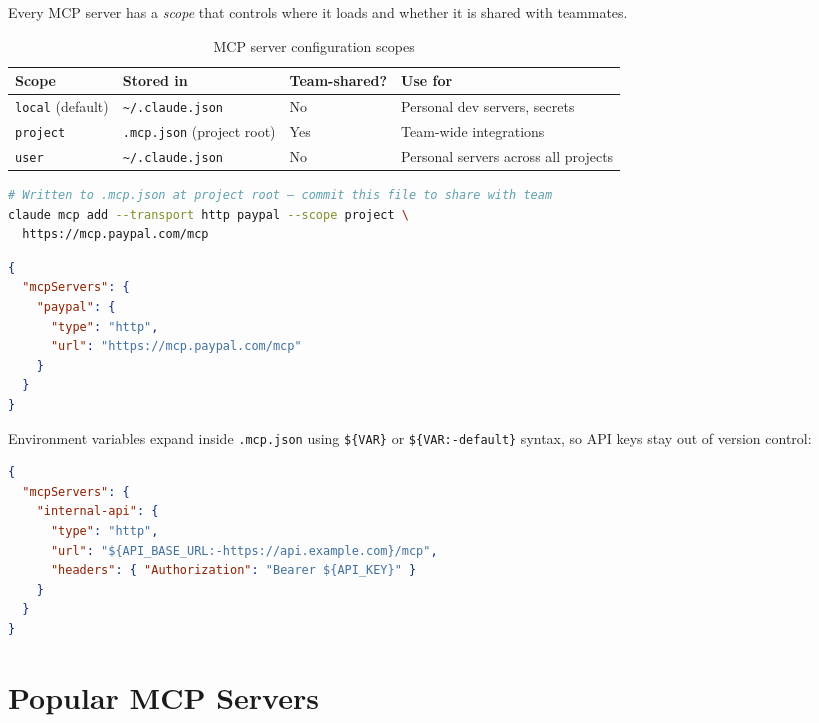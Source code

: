 
Every MCP server has a \emph{scope} that controls where it loads and whether
it is shared with teammates.

\begin{table}[ht]
\centering
\caption{MCP server configuration scopes}
\label{tab:mcp-scopes}
\begin{tabularx}{\textwidth}{lllX}
\toprule
\textbf{Scope} & \textbf{Stored in} & \textbf{Team-shared?} & \textbf{Use for} \\
\midrule
\texttt{local} (default) & \texttt{\textasciitilde/.claude.json}
  & No & Personal dev servers, secrets \\
\texttt{project}         & \texttt{.mcp.json} (project root)
  & Yes & Team-wide integrations \\
\texttt{user}            & \texttt{\textasciitilde/.claude.json}
  & No & Personal servers across all projects \\
\bottomrule
\end{tabularx}
\end{table}

\begin{lstlisting}[language=bash,caption={Adding a project-scoped server}]
# Written to .mcp.json at project root — commit this file to share with team
claude mcp add --transport http paypal --scope project \
  https://mcp.paypal.com/mcp
\end{lstlisting}

\begin{lstlisting}[language=json,caption={Resulting \texttt{.mcp.json} (safe to commit — no secrets)}]
{
  "mcpServers": {
    "paypal": {
      "type": "http",
      "url": "https://mcp.paypal.com/mcp"
    }
  }
}
\end{lstlisting}

Environment variables expand inside \texttt{.mcp.json} using
\texttt{\$\{VAR\}} or \texttt{\$\{VAR:-default\}} syntax, so API keys stay
out of version control:

\begin{lstlisting}[language=json,caption={Environment variable expansion in \texttt{.mcp.json}}]
{
  "mcpServers": {
    "internal-api": {
      "type": "http",
      "url": "${API_BASE_URL:-https://api.example.com}/mcp",
      "headers": { "Authorization": "Bearer ${API_KEY}" }
    }
  }
}
\end{lstlisting}

\section{Popular MCP Servers}
\label{sec:mcp-popular}

